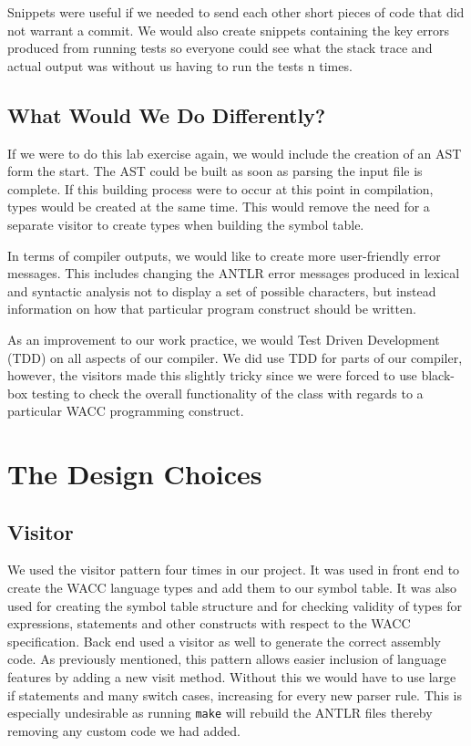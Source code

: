 \documentclass[11pt,a4paper]{article}
\begin{document}
Snippets were useful if we needed to send each other short pieces of code that did not warrant a commit. We would also create snippets containing the key errors produced from running tests so everyone could see what the stack trace and actual output was without us having to run the tests n times.

\subsection{What Would We Do Differently?}
\label{sub:What Would We Do Differently?}

If we were to do this lab exercise again, we would include the creation of an AST form the start. The AST could be built as soon as parsing the input file is complete. If this building process were to occur at this point in compilation, types would be created at the same time. This would remove the need for a separate visitor to create types when building the symbol table.

In terms of compiler outputs, we would like to create more user-friendly error messages. This includes changing the ANTLR error messages produced in lexical and syntactic analysis not to display a set of possible characters, but instead information on how that particular program construct should be written.

As an improvement to our work practice, we would Test Driven Development (TDD) on all aspects of our compiler. We did use TDD for parts of our compiler, however, the visitors made this slightly tricky since we were forced to use black-box testing to check the overall functionality of the class with regards to a particular WACC programming construct.

\section{The Design Choices}
\label{sec:The Design Choices}

\subsection{Visitor}
\label{sub:Visitor}
We used the visitor pattern four times in our project. It was used in front end to create the WACC language types and add them to our symbol table. It was also used for creating the symbol table structure and for checking validity of types for expressions, statements and other constructs with respect to the WACC specification. Back end used a visitor as well to generate the correct assembly code. As previously mentioned, this pattern allows easier inclusion of language features by adding a new visit method. Without this we would have to use large if statements and many switch cases, increasing for every new parser rule. This is especially undesirable as running \texttt{make} will rebuild the ANTLR files thereby removing any custom code we had added.
\end{document}
